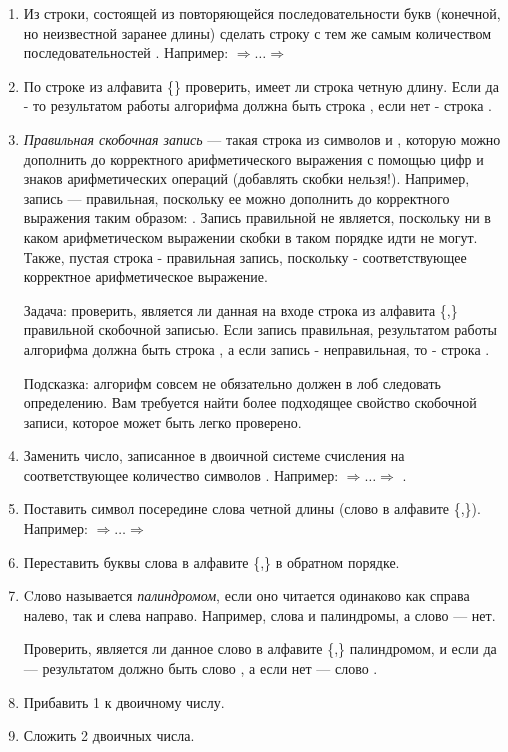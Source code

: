 \begin{enumerate}
\item Из строки, состоящей из повторяющейся последовательности букв 
(конечной, но неизвестной заранее длины) сделать строку с тем же самым
количеством последовательностей .
Например:  $\Rightarrow\dots\Rightarrow$ 

\item По строке из алфавита \{\} проверить, имеет ли строка четную длину.
Если да - то результатом работы алгорифма должна быть строка , если
нет - строка .

\item \emph{Правильная скобочная запись} --- такая строка из 
символов \s{(} и \s{)}, которую можно дополнить до корректного 
арифметического выражения с помощью цифр и знаков арифметических операций 
(добавлять скобки нельзя!). 
Например, запись \s{(()())} --- правильная, поскольку 
ее можно дополнить до корректного выражения таким образом: 
. Запись \s{)(} правильной не является, поскольку 
ни в каком арифметическом выражении скобки в таком порядке идти не могут. 
Также, пустая строка - правильная запись, поскольку  - соответствующее 
корректное арифметическое выражение. 

Задача: проверить, является ли данная на входе строка из алфавита \{\s{(},\s{)}\}
правильной скобочной записью. Если запись правильная, результатом работы 
алгорифма должна быть строка , а если запись - неправильная, 
то - строка .

Подсказка: алгорифм совсем не обязательно должен в лоб следовать 
определению. Вам требуется найти более подходящее свойство скобочной 
записи, которое может быть легко проверено.

\item Заменить число, записанное в двоичной системе счисления на 
соответствующее количество символов \s{|}. Например: 
 $\Rightarrow\dots\Rightarrow$ \s{||||||}.

\item Поставить символ \s{|} посередине слова четной длины (слово в алфавите
\{,\}). 
Например:  $\Rightarrow\dots\Rightarrow$ 

\item Переставить буквы слова в алфавите \{,\} в обратном порядке.

\item Cлово называется \emph{палиндромом}, если оно читается одинаково
как справа налево, так и слева направо. Например, слова  и 
 палиндромы, а слово  --- нет. 

Проверить, является ли данное слово в алфавите \{,\} 
палиндромом, и если да --- результатом должно быть слово , 
а если нет --- слово .

\item Прибавить 1 к двоичному числу.

\item Сложить 2 двоичных числа.
\end{enumerate}
